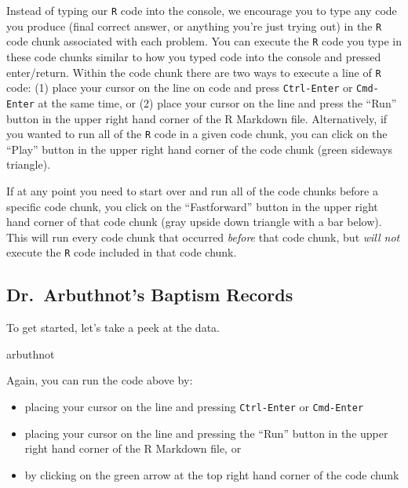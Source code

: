 \documentclass[
]{article}
\newenvironment{Shaded}{\begin{snugshade}}{\end{snugshade}}
\newcommand{\NormalTok}[1]{#1}
\providecommand{\tightlist}{%
  \setlength{\itemsep}{0pt}\setlength{\parskip}{0pt}}
\begin{document}
Instead of typing our \texttt{R} code into the console, we encourage you to type any code you produce (final correct answer, or anything you're just trying out) in the \texttt{R} code chunk associated with each problem. You can execute the \texttt{R} code you type in these code chunks similar to how you typed code into the console and pressed enter/return. Within the code chunk there are two ways to execute a line of \texttt{R} code: (1) place your cursor on the line on code and press \texttt{Ctrl-Enter} or \texttt{Cmd-Enter} at the same time, or (2) place your cursor on the line and press the ``Run'' button in the upper right hand corner of the R Markdown file. Alternatively, if you wanted to run all of the \texttt{R} code in a given code chunk, you can click on the ``Play'' button in the upper right hand corner of the code chunk (green sideways triangle).

If at any point you need to start over and run all of the code chunks before a specific code chunk, you click on the ``Fastforward'' button in the upper right hand corner of that code chunk (gray upside down triangle with a bar below). This will run every code chunk that occurred \emph{before} that code chunk, but \emph{will not} execute the \texttt{R} code included in that code chunk.

\hypertarget{dr.-arbuthnots-baptism-records}{%
\subsection{Dr.~Arbuthnot's Baptism Records}\label{dr.-arbuthnots-baptism-records}}

To get started, let's take a peek at the data.

\begin{Shaded}
\begin{Highlighting}[]
\NormalTok{arbuthnot}
\end{Highlighting}
\end{Shaded}

Again, you can run the code above by:

\begin{itemize}
\tightlist
\item
  placing your cursor on the line and pressing \texttt{Ctrl-Enter} or \texttt{Cmd-Enter}
\item
  placing your cursor on the line and pressing the ``Run'' button in the upper right hand corner of the R Markdown file, or
\item
  by clicking on the green arrow at the top right hand corner of the code chunk
\end{itemize}
\end{document}
